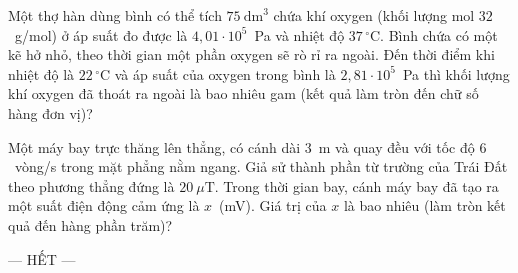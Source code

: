 	\begin{ex}%
		Một thợ hàn dùng bình có thể tích $75~\text{dm}^3$ chứa khí oxygen (khối lượng mol $32$~g/mol) ở áp suất đo được là $4{,}01\cdot 10^5$~Pa và nhiệt độ $37\,^\circ\text{C}$. Bình chứa có một kẽ hở nhỏ, theo thời gian một phần oxygen sẽ rò rỉ ra ngoài. Đến thời điểm khi nhiệt độ là $22\,^\circ\text{C}$ và áp suất của oxygen trong bình là $2{,}81\cdot 10^5$~Pa thì khối lượng khí oxygen đã thoát ra ngoài là bao nhiêu gam (kết quả làm tròn đến chữ số hàng đơn vị)?
		\par
	\end{ex}

	\begin{ex}%
		Một máy bay trực thăng lên thẳng, có cánh dài $3$~m và quay đều với tốc độ $6$~vòng/s trong mặt phẳng nằm ngang. Giả sử thành phần từ trường của Trái Đất theo phương thẳng đứng là $20~\mu\text{T}$. Trong thời gian bay, cánh máy bay đã tạo ra một suất điện động cảm ứng là $x$~(mV). Giá trị của $x$ là bao nhiêu (làm tròn kết quả đến hàng phần trăm)?
		\par
	\end{ex}

	\centerline{--- HẾT ---}


